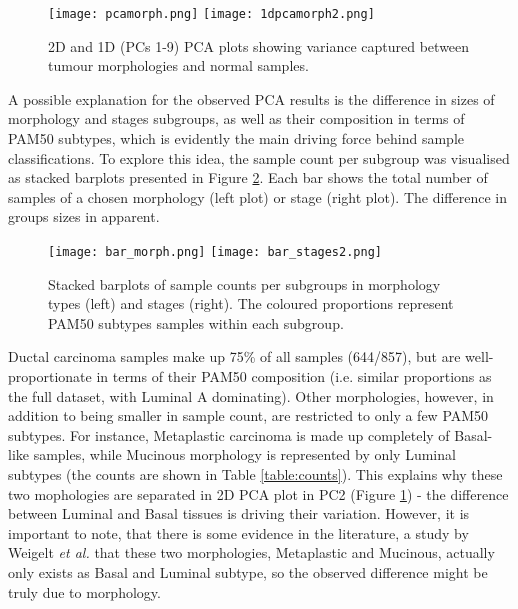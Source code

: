             \begin{figure}[!h]
            \centering
            \hspace*{\fill}
            \texttt{[image: pcamorph.png]}\hfill
            \texttt{[image: 1dpcamorph2.png]}
            \hspace*{\fill}
            \caption[PCA plots (2D and 1D) showing separation by tumour morphologies]{2D and 1D (PCs 1-9) PCA plots showing variance captured between tumour morphologies and normal samples.}
            \label{fig:1dpcamorph}
            \end{figure}

    
    \newpage
    A possible explanation for the observed PCA results is the difference in sizes of morphology and stages subgroups, as well as their composition in terms of PAM50 subtypes, which is evidently the main driving force behind sample classifications. To explore this idea, the sample count per subgroup was visualised as stacked barplots presented in Figure \ref{fig:barms}. Each bar shows the total number of samples of a chosen morphology (left plot) or stage (right plot). The difference in groups sizes in apparent.
       
        \begin{figure}[!h]
        \texttt{[image: bar\_morph.png]}\hfill
        \texttt{[image: bar\_stages2.png]}
        \caption[Stacked barplots of samples count per stage and morphology type]{Stacked barplots of sample counts per subgroups in morphology types (left) and stages (right). The coloured proportions represent PAM50 subtypes samples within each subgroup.}
        \label{fig:barms}
        \end{figure}
        
    Ductal carcinoma samples make up 75\% of all samples (644/857), but are well-proportionate in terms of their PAM50 composition (i.e. similar proportions as the full dataset, with Luminal A dominating). Other morphologies, however, in addition to being smaller in sample count, are restricted to only a few PAM50 subtypes. For instance, Metaplastic carcinoma is made up completely of Basal-like samples, while Mucinous morphology is represented by only Luminal subtypes (the counts are shown in Table \ref{table:counts}). This explains why these two mophologies are separated in 2D PCA plot in PC2 (Figure \ref{fig:1dpcamorph}) - the difference between Luminal and Basal tissues is driving their variation. However, it is important to note, that there is some evidence in the literature, a study by Weigelt \textit{et al.} \cite{Weigelt2010a} that these two morphologies, Metaplastic and Mucinous, actually only exists as Basal and Luminal subtype, so the observed difference might be truly due to morphology.  
    
